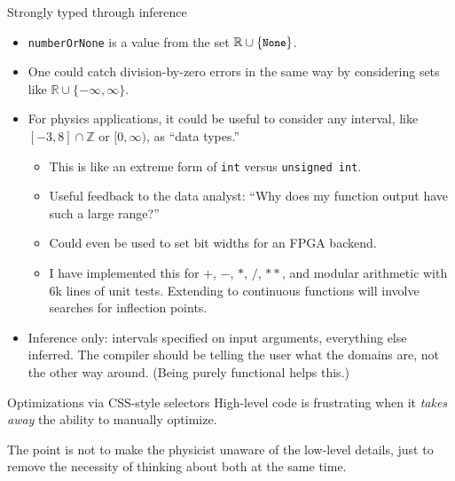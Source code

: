 \documentclass{beamer}
\begin{document}
\begin{frame}{Strongly typed through inference}
\vspace{0.3 cm}
\begin{itemize}
\item<1-> {\tt \small numberOrNone} is a value from the set $\mathbb{R} \cup \{\mbox{\tt \small None}\}$.

\item<2-> One could catch division-by-zero errors in the same way by considering sets like $\mathbb{R} \cup \{-\infty, \infty\}$.

\item<3-> For physics applications, it could be useful to consider any interval, like $[-3, 8] \cap \mathbb{Z}$ or $[0, \infty)$, as ``data types.''
\begin{itemize}
\item<4-> This is like an extreme form of {\tt \small int} versus {\tt \small unsigned int}.
\item<4-> Useful feedback to the data analyst: ``Why does my function output have such a large range?''
\item<4-> Could even be used to set bit widths for an FPGA backend.
\item<4-> I have implemented this for $+$, $-$, $*$, $/$, $**$, and modular arithmetic with 6k lines of unit tests. Extending to continuous functions will involve searches for inflection points.
\end{itemize}
\item<5-> Inference only: intervals specified on input arguments, everything else inferred. The compiler should be telling the user what the domains are, not the other way around. (Being purely functional helps this.)
\end{itemize}
\end{frame}

\begin{frame}{Optimizations via CSS-style selectors}
\vfill
High-level code is frustrating when it {\it takes away} the ability to manually optimize.

\vfill
The point is not to make the physicist unaware of the low-level details, just to remove the necessity of thinking about both at the same time.

\vfill
{}
\end{frame}
\end{document}
